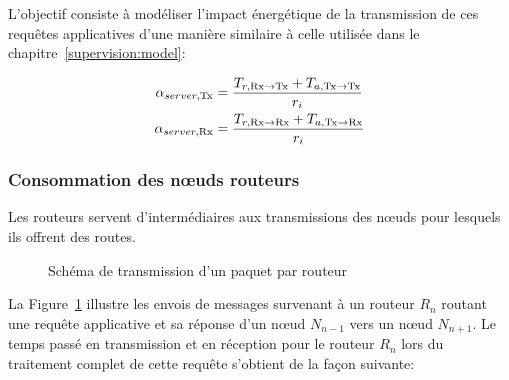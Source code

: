L'objectif consiste à modéliser l'impact énergétique de la transmission de ces requêtes applicatives d'une manière similaire à celle utilisée dans le chapitre~\ref{supervision:model}:

\begin{align}
  \alpha_{server, \textrm{Tx}} &= \frac{T_{r, \textrm{Rx} \to \textrm{Tx}} + T_{a, \textrm{Tx} \to \textrm{Tx}}}{r_i} 
  \label{contikimac:eq:coap_tx} \\
  \alpha_{server, \textrm{Rx}} &= \frac{T_{r, \textrm{Rx} \to \textrm{Rx}} + T_{a, \textrm{Tx} \to \textrm{Rx}}}{r_i}
  \label{contikimac:eq:coap_rx}
\end{align}

\subsubsection{Consommation des nœuds routeurs}

Les routeurs servent d'intermédiaires aux transmissions des nœuds pour lesquels ils offrent des routes.

\begin{figure}[ht]
  \centering
  \caption{Schéma de transmission d'un paquet par routeur}
  \label{contikimac:fig:router}
\end{figure}

La Figure~\ref{contikimac:fig:router} illustre les envois de messages survenant à un routeur $R_n$ routant une requête applicative et sa réponse d'un nœud $N_{n-1}$ vers un nœud $N_{n+1}$.
Le temps passé en transmission et en réception pour le routeur $R_n$ lors du traitement complet de cette requête s'obtient de la façon suivante:

